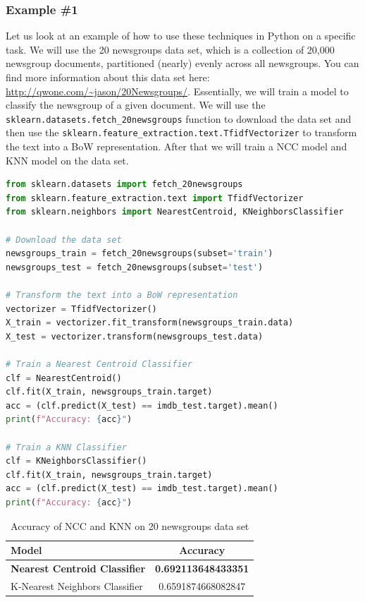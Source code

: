 \subsubsection{Example \#1}
Let us look at an example of how to use these techniques in Python on a specific task.
We will use the 20 newsgroups data set, which is a collection of 20,000 newsgroup documents, partitioned (nearly) evenly across all newsgroups.
You can find more information about this data set here: \url{http://qwone.com/~jason/20Newsgroups/}.
Essentially, we will train a model to classify the newsgroup of a given document.
We will use the \lstinline{sklearn.datasets.fetch_20newsgroups} function to download the data set and then use the \lstinline{sklearn.feature_extraction.text.TfidfVectorizer}
to transform the text into a BoW representation.
After that we will train a NCC model and KNN model on the data set.
\begin{lstlisting}[language=Python, caption={20 newsgroups example}, label={code:20-newsgroups}]
from sklearn.datasets import fetch_20newsgroups
from sklearn.feature_extraction.text import TfidfVectorizer
from sklearn.neighbors import NearestCentroid, KNeighborsClassifier

# Download the data set
newsgroups_train = fetch_20newsgroups(subset='train')
newsgroups_test = fetch_20newsgroups(subset='test')

# Transform the text into a BoW representation
vectorizer = TfidfVectorizer()
X_train = vectorizer.fit_transform(newsgroups_train.data)
X_test = vectorizer.transform(newsgroups_test.data)

# Train a Nearest Centroid Classifier
clf = NearestCentroid()
clf.fit(X_train, newsgroups_train.target)
acc = (clf.predict(X_test) == imdb_test.target).mean()
print(f"Accuracy: {acc}")

# Train a KNN Classifier
clf = KNeighborsClassifier()
clf.fit(X_train, newsgroups_train.target)
acc = (clf.predict(X_test) == imdb_test.target).mean()
print(f"Accuracy: {acc}")
\end{lstlisting}

\begin{table}[h]
  \centering
  \begin{tabular}{|l|c|}
    \hline
    \textbf{Model} & \textbf{Accuracy} \\
    \hline
    \textbf{Nearest Centroid Classifier} & \textbf{0.692113648433351}\\
    K-Nearest Neighbors Classifier & 0.6591874668082847\\
    \hline
  \end{tabular}
  \caption{Accuracy of NCC and KNN on 20 newsgroups data set}
  \label{tab:20-newsgroups}
\end{table}

